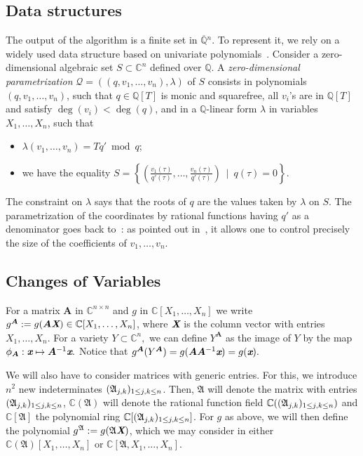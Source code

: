 \documentclass[a4paper]{article}
\def\scrQ{\ensuremath{\mathscr{Q}}}
\def\A{\mathfrak{A}}
\def\Xb{\textit{\textbf{X}}}
\def\mA{{\bm A}}
\def\xb{\textit{\textbf{x}}}
\def\C{\mathbb{C}}
\def\Q{\mathbb{Q}}
\begin{document}
\subsection{Data structures} 
%
The output of the algorithm is a finite set in $\overline{\Q}{}^n$. To
represent it, we rely on a widely used data structure based on
univariate
polynomials~\cite{Kronecker82,Macaulay16,GiMo89,GiHeMoPa95,ABRW,GiHaHeMoMoPa97,GiHeMoMoPa98,Rouillier99}.
Consider a zero-dimensional algebraic set $S \subset \C^n$ defined
over $\Q$. A {\em zero-dimensional parametrization}
$\scrQ=((q,v_1,\dots,v_n),\lambda)$ of $S$ consists in polynomials
$(q,v_1,\dots,v_n)$, such that $q\in \Q[T]$ is monic and squarefree,
all $v_i$'s are in $\Q[T]$ and satisfy $\deg(v_i) < \deg(q)$, and in a
$\Q$-linear form $\lambda$ in variables $X_1,\dots,X_n$, such that
\begin{itemize}
\item $\lambda(v_1,\dots,v_n)=T q' \bmod q$;
\item we have the equality
  $S=\left \{\left(
      \frac{v_1(\tau)}{q'(\tau)},\dots,\frac{v_n(\tau)}{q'(\tau)}\right
    ) \ \mid \ q(\tau)=0 \right \}.$
\end{itemize}
The constraint on $\lambda$ says that the roots of $q$ are the values
taken by $\lambda$ on $S$. The parametrization of the coordinates by
rational functions having $q'$ as a denominator goes back
to~\cite{Kronecker82,Macaulay16}: as pointed out in~\cite{ABRW}, it
allows one to control precisely the size of the coefficients of
$v_1,\dots,v_n$.

%
\subsection{Changes of Variables}
For a matrix $\mA$ in $\C^{n\times n}$ and $g$ in
$\C[X_1,\hdots,X_n]$ we write $g^\mA:=g(\mA \Xb) \in
\C[X_1,\dots,X_n]$, where $\Xb$ is the column vector with entries
$X_1,\dots,X_n$. For a variety $Y \subset \C^n,$ we can define $Y^{\mA}$ as the image of $Y$ by the map $\phi_{\mA} : \xb \mapsto \mA^{-1}\xb.$ Notice that $g^{\mA}(Y^{\mA}) = g(\mA \mA^{-1}\xb)=g(\xb).$ 

We will also have to consider matrices with generic entries. For this,
we introduce $n^2$ new indeterminates $(\frak A_{j,k})_{1\le j,k \le
  n}$. Then, $\A$ will denote the matrix with entries $(\frak
A_{j,k})_{1\le j,k \le n}$, $\C(\A)$ will denote the rational function
field $\C((\frak A_{j,k})_{1\le j,k \le n})$ and $\C[\A]$ the
polynomial ring $\C[(\frak A_{j,k})_{1\le j,k \le n}]$.  For $g$ as
above, we will then define the polynomial $g^\A:=g(\A \Xb)$, 
which we may consider in either
$\C(\A)[X_1,\dots,X_n]$ or $\C[\A,X_1,\dots,X_n]$.
\end{document}
